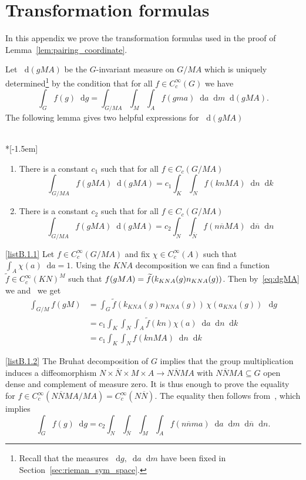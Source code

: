 \documentclass[AHL, Unicode, longabstracts, published]{cedram}
\newcommand{\til}{\widetilde}
\newcommand{\intd}{\mathop{}\!\mathrm{d}}
\newcommand{\bn}{{\overline{n}}}
\newcommand{\bN}{{\overline{N}}}
\newcommand*{\romanenumi}{\renewcommand*{\theenumi}{\roman{enumi}}}
\begin{document}
\section{Transformation formulas}

In this appendix we prove the transformation formulas used in the proof of Lemma~\ref{lem:pairing_coordinate}.

Let $\intd(gMA)$ be the $G$-invariant measure on $G/MA$ which is uniquely determined\footnote{Recall that the measures $\intd g,\intd a\intd m$ have been fixed in Section~\ref{sec:rieman_sym_space}.} by the condition that for all $f\in C_c^\infty(G)$ we have
\begin{equation}\label{eq:dgMA}
\int_G f(g)\intd g =\int_{G/MA} \int_M \int_A f(gma)\intd a\intd m\intd(gMA).
\end{equation}
The following lemma gives two helpful expressions for $\intd (gMA)$

\begin{lemm}\label{lem:dgMA}\ \\*[-1.5em]
\begin{enumerate}\romanenumi
\item \label{listB.1.1}There is a constant $c_1$ such that for all $f\in C_c(G/MA)$
\[
\int_{G/MA} f(gMA) \intd(gMA) = c_1 \int_K\int_{N} f(knMA) \intd n\intd k
\]
\item \label{listB.1.2}There is a constant $c_2$ such that for all $f\in C_c(G/MA)$
\[
\int_{G/MA} f(gMA) \intd(gMA) = c_2 \int_N \int_{\bN} f(n\bn MA) \intd \bn\intd n
\]
\end{enumerate}
\end{lemm}


\begin{proofc}

\eqref{listB.1.1} Let $f\in C_c^\infty(G/MA)$ and fix $\chi\in C_c^\infty(A)$ such that $\int_A\chi(a)\intd a =1$. Using the $KNA$ decomposition we can find a function $\til f\in C_c^\infty(KN)^M$ such that $f(gMA)\linebreak = \til f(k_{KNA}(g)n_{KNA}(g))$. Then by~\eqref{eq:dgMA} we and~\cite[Corollary~I.5.3]{Hel84} we get
\begin{align*}
\int_{G/M} f(gM) &= \int_G \til f(k_{KNA}(g)n_{KNA}(g))\,\chi(a_{KNA}(g))\,\intd g\\
&=c_1\int_K\int_N\int_A \til f(kn)\chi(a)\intd a\intd n \intd k\\
&=c_1\int_K\int_N f(knMA)\intd n\intd k
\end{align*}

\eqref{listB.1.2} The Bruhat decomposition of $G$ implies that the group multiplication induces a diffeomorphism $N\times \overline N\times M\times A\to N\overline NMA$ with $N\overline NMA\subseteq G$ open dense and complement of measure zero. It is thus enough to prove the equality for $f\in C_c^\infty(N\bN MA/MA)=C_c^\infty(N\bN)$. The equality then follows from~\cite[Proposition~I.5.21]{Hel84}, which implies
\begin{equation}\label{eq:Bruhat-integral}
\int_G f(g)\intd g =c_2 \int_{N}\int_{\overline N}\int_M\int_A f(n\overline nma)\intd a\intd m\intd\overline n\intd n.
\end{equation}
\end{proofc}
\end{document}
